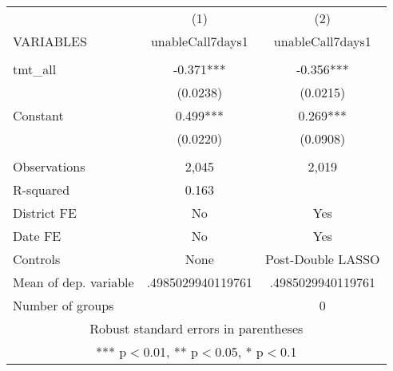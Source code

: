 \documentclass[]{article}
\begin{document}
\begin{tabular}{lcc} \hline
 & (1) & (2) \\
VARIABLES & unableCall7days1 & unableCall7days1 \\ \hline
 &  &  \\
tmt\_all & -0.371*** & -0.356*** \\
 & (0.0238) & (0.0215) \\
Constant & 0.499*** & 0.269*** \\
 & (0.0220) & (0.0908) \\
 &  &  \\
Observations & 2,045 & 2,019 \\
R-squared & 0.163 &  \\
District FE & No & Yes \\
Date FE & No & Yes \\
Controls & None & Post-Double LASSO \\
Mean of dep. variable & .4985029940119761 & .4985029940119761 \\
 Number of groups &  & 0 \\ \hline
\multicolumn{3}{c}{ Robust standard errors in parentheses} \\
\multicolumn{3}{c}{ *** p$<$0.01, ** p$<$0.05, * p$<$0.1} \\
\end{tabular}
\end{document}
